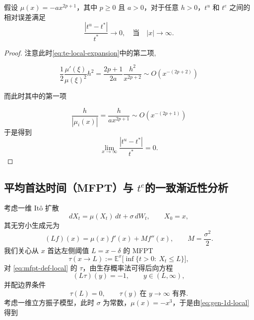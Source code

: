 \begin{theorem}
	假设 $\mu(x)=-a x^{2p+1}$，其中 $p \geq 0$ 且 $a > 0$，对于任意 $h > 0$，$t^u$ 和 $t^e$ 之间的相对误差满足
	\[
	\frac{|t^u - t^*|}{t^*}  \to 0, \quad \text{当} \quad |x| \to \infty .
	\]
	
\end{theorem}

\begin{proof}
	
注意此时\eqref{eq:te-local-expansion}中的第二项, 
	
\[
\frac{1}{2} \frac{\mu'(\xi)}{\mu(\xi)^2} h^2 =  \frac{2p + 1}{2a}\frac{h^2}{x^{2p + 2}}  \sim O(x^{-(2p + 2)}) 
\]
	
而此时其中的第一项

\[
\frac{h}{|\mu_i(x)|}  = \frac{h}{a x^{2p+1}} \sim O(x^{-(2p+1)})
\]
于是得到
\[
\lim_{x \to \infty}\frac{|t^u - t^*|}{t^*} =0.
\]
\end{proof}

\newpage


\subsection{平均首达时间（MFPT）与 \(t^e\)的一致渐近性分析}\label{subsec:mfpt-pre-asym}

考虑一维 It\^o 扩散
\begin{equation}\label{eq:sde-mfpt-local}
	dX_t=\mu(X_t)\,dt+\sigma\,dW_t,\qquad X_0=x,
\end{equation}
其无穷小生成元为
\begin{equation}\label{eq:gen-1d-local}
	(L f)(x)=\mu(x)f'(x)+M f''(x),\qquad M=\frac{\sigma^{2}}{2}.
\end{equation}
我们关心从 $x$ 首达左侧阈值 $L=x-\delta$ 的 MFPT
\begin{equation}\label{eq:mfpt-def-local}
	\tau(x\to L):=\mathbb E^{x}\!\big[\inf\{t>0:\ X_t\le L\}\big],
\end{equation}
对 \eqref{eq:mfpt-def-local} 的 $\tau$，由生存概率法\cite{weinan2021applied}可得后向方程
\begin{equation}\label{eq:backward-mfpt-local}
	(L\tau)(y)=-1,\qquad y\in(L,\infty),
\end{equation}
并配边界条件
\begin{equation}\label{eq:bc-local}
	\tau(L)=0,\qquad \tau(y)\ \text{在 }y\to\infty\text{ 有界}.
\end{equation}
考虑一维立方振子模型，此时 $\sigma$ 为常数，\( \mu(x) = -x^3 \)，于是由\eqref{eq:gen-1d-local} 得到

